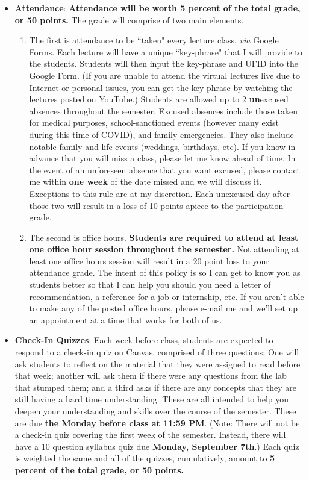 \documentclass[11pt]{article}
\begin{document}
\begin{itemize}
	\item \textbf{Attendance}: \textbf{Attendance will be worth 5 percent of the total grade, or 50 points.} The grade will comprise of two main elements. 
	\begin{enumerate}
	\item The first is attendance to be ``taken" every lecture class, \textit{via} Google Forms. Each lecture will have a unique ``key-phrase" that I will provide to the students. Students will then input the key-phrase and UFID into the Google Form. (If you are unable to attend the virtual lectures live due to Internet or personal issues, you can get the key-phrase by watching the lectures posted on YouTube.) Students are allowed up to 2 \textbf{un}excused absences throughout the semester. Excused absences include those taken for medical purposes, school-sanctioned events (however many exist during this time of COVID), and family emergencies. They also include notable family and life events (weddings, birthdays, etc). If you know in advance that you will miss a class, please let me know ahead of time. In the event of an unforeseen absence that you want excused, please contact me within \textbf{one week} of the date missed and we will discuss it. Exceptions to this rule are at my discretion. Each unexcused day after those two will result in a loss of 10 points apiece to the participation grade.
	\item The second is office hours. \textbf{Students are required to attend at least one office hour session throughout the semester.} Not attending at least one office hours session will result in a 20 point loss to your attendance grade. The intent of this policy is so I can get to know you as students better so that I can help you should you need a letter of recommendation, a reference for a job or internship, etc. If you aren't able to make any of the posted office hours, please e-mail me and we'll set up an appointment at a time that works for both of us.  
	\end{enumerate}	 
	\item \textbf{Check-In Quizzes}: Each week before class, students are expected to respond to a check-in quiz on Canvas, comprised of three questions: One will ask students to reflect on the material that they were assigned to read before that week; another will ask them if there were any questions from the lab that stumped them; and a third asks if there are any concepts that they are still having a hard time understanding. These are all intended to help you deepen your understanding and skills over the course of the semester. These are due \textbf{the Monday before class at 11:59 PM}. (Note: There will not be a check-in quiz covering the first week of the semester. Instead, there  will have a 10 question syllabus quiz due \textbf{Monday, September 7th}.) Each quiz is weighted the same and all of the quizzes, cumulatively, amount to \textbf{5 percent of the total grade, or 50 points.} 

\end{itemize}
\end{document}
